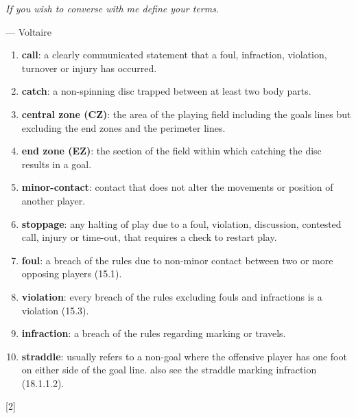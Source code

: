 \begin{flushright}
\begin{minipage}{9cm}
    \begin{flushleft} \emph{If you wish to converse with me define your terms.} \end{flushleft}
    \begin{flushright}--- Voltaire\end{flushright}
\end{minipage}
\end{flushright}

\small
\begin{enumerate}
    \item \textbf{call}: a clearly communicated statement that a foul, infraction, violation, turnover or injury has occurred.
    \item \textbf{catch}: a non-spinning disc trapped between at least two body parts.
    \item \textbf{central zone (CZ)}: the area of the playing field including the goals lines but excluding the end zones and the perimeter lines.
    \item \textbf{end zone (EZ)}: the section of the field within which catching the disc results in a goal.
    \item \textbf{minor-contact}: contact that does not alter the movements or position of another player.
    \item \textbf{stoppage}: any halting of play due to a foul, violation, discussion, contested call, injury or time-out, that requires a check to restart play.
    \item \textbf{foul}: a breach of the rules due to non-minor contact between two or more opposing players (15.1).
    \item \textbf{violation}: every breach of the rules excluding fouls and infractions is a violation (15.3).
    \item \textbf{infraction}: a breach of the rules regarding marking or travels.
    \item \textbf{straddle}: usually refers to a non-goal where the offensive player has one foot on either side of the goal line. also see the straddle marking infraction (18.1.1.2).
\end{enumerate}

\begin{center}[2]\end{center}
